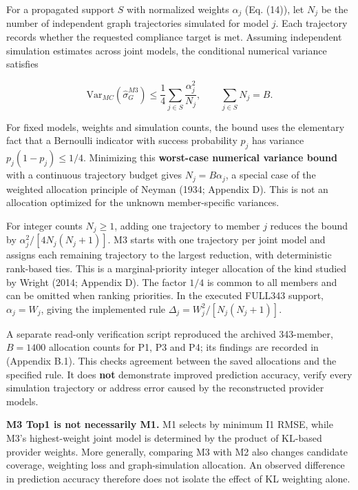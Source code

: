 \documentclass[10pt,a4paper]{article}
\begin{document}
For a propagated support $S$ with normalized weights $\alpha_j$ (Eq. (14)), let $N_j$ be the number of independent graph trajectories simulated for model $j$. Each trajectory records whether the requested compliance target is met. Assuming independent simulation estimates across joint models, the conditional numerical variance satisfies

\begin{equation*}
\mathrm{Var}_{MC}(\widehat\sigma_G^{M3})
\le\frac14\sum_{j\in S}\frac{\alpha_j^2}{N_j},
\qquad \sum_{j\in S}N_j=B.
\tag{15}
\end{equation*}

For fixed models, weights and simulation counts, the bound uses the elementary fact that a Bernoulli indicator with success probability $p_j$ has variance $p_j(1-p_j)\le1/4$. Minimizing this \textbf{worst-case numerical variance bound} with a continuous trajectory budget gives $N_j=B\alpha_j$, a special case of the weighted allocation principle of Neyman (1934; Appendix D). This is not an allocation optimized for the unknown member-specific variances.

For integer counts $N_j\ge1$, adding one trajectory to member $j$ reduces the bound by $\alpha_j^2/[4N_j(N_j+1)]$. M3 starts with one trajectory per joint model and assigns each remaining trajectory to the largest reduction, with deterministic rank-based ties. This is a marginal-priority integer allocation of the kind studied by Wright (2014; Appendix D). The factor $1/4$ is common to all members and can be omitted when ranking priorities. In the executed FULL343 support, $\alpha_j=W_j$, giving the implemented rule $\Delta_j=W_j^2/[N_j(N_j+1)]$.

A separate read-only verification script  reproduced the archived 343-member, $B=1400$ allocation counts for P1, P3 and P4; its findings are recorded in  (Appendix B.1). This checks agreement between the saved allocations and the specified rule. It does \textbf{not} demonstrate improved prediction accuracy, verify every simulation trajectory or address error caused by the reconstructed provider models.

\textbf{M3 Top1 is not necessarily M1.} M1 selects by minimum I1 RMSE, while M3's highest-weight joint model is determined by the product of KL-based provider weights. More generally, comparing M3 with M2 also changes candidate coverage, weighting loss and graph-simulation allocation. An observed difference in prediction accuracy therefore does not isolate the effect of KL weighting alone.
\end{document}
